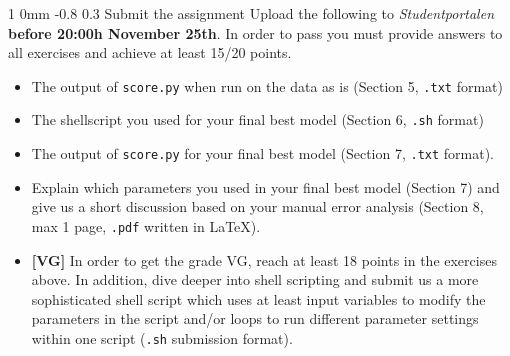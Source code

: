 \documentclass[11pt]{article}
\makeatletter
\newcommand{\newsec}[2]{\section{#1}\label{sec:#2}\noindent}
\renewcommand{\section}{\@startsection
{section}%
{1}%
{0mm}%
{-0.8\baselineskip}%
{0.3\baselineskip}%
{\bfseries\large}}%
\makeatother
\begin{document}
\newsec{Submit the assignment}{submit}%
Upload the following to {\it Studentportalen}
\textbf{before 20:00h November 25th}. In order to pass you must
provide answers to all exercises and achieve at least 15/20 points.
\begin{itemize}[noitemsep,topsep=0.2cm]
\item The output of {\tt score.py} when run on the data as is (Section 5, \texttt{.txt} format)
\item The shellscript you used for your final best model (Section 6, \texttt{.sh} format)
\item The output of {\tt score.py} for your final best model (Section 7, \texttt{.txt} format).
\item  Explain which parameters you used in your final best model (Section 7)
and give us a short discussion based on your manual error analysis (Section 8, max 1 page, \texttt{.pdf} written in \LaTeX).
\item \textbf{[VG]} In order to get the grade VG, reach at least 18
  points in the exercises above. In addition, dive deeper into shell
  scripting and submit us a more sophisticated shell script which uses
  at least input variables to modify the parameters in the script
  and/or loops to run different parameter settings within one script
  (\texttt{.sh} submission format).
\end{itemize}
\end{document}
